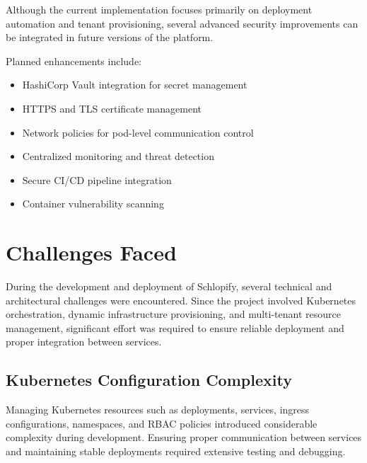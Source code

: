\documentclass[12pt,a4paper]{report}
\begin{document}
Although the current implementation focuses primarily on deployment automation and tenant provisioning, several advanced security improvements can be integrated in future versions of the platform.

Planned enhancements include:

\begin{itemize}

    \item HashiCorp Vault integration for secret management
    \item HTTPS and TLS certificate management
    \item Network policies for pod-level communication control
    \item Centralized monitoring and threat detection
    \item Secure CI/CD pipeline integration
    \item Container vulnerability scanning

\end{itemize}













\newpage

\chapter{Challenges Faced}

During the development and deployment of Schlopify, several technical and architectural challenges were encountered. Since the project involved Kubernetes orchestration, dynamic infrastructure provisioning, and multi-tenant resource management, significant effort was required to ensure reliable deployment and proper integration between services.

\section{Kubernetes Configuration Complexity}

Managing Kubernetes resources such as deployments, services, ingress configurations, namespaces, and RBAC policies introduced considerable complexity during development. Ensuring proper communication between services and maintaining stable deployments required extensive testing and debugging.
\end{document}
